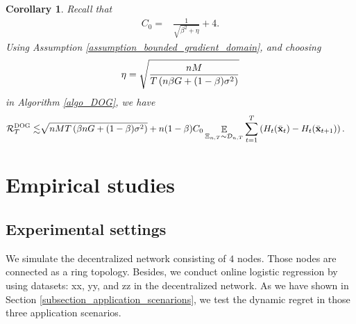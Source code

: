 \documentclass{article}
\newtheorem{Corollary}{\bf{Corollary}}
\newtheorem{Assumption}{\bf{Assumption}}
\begin{document}
\begin{Corollary}
Recall that 
\begin{align}
\nonumber
C_0 = & \frac{1}{\sqrt{\beta^2 + \eta}} + 4.
\end{align}
Using Assumption \ref{assumption_bounded_gradient_domain}, and choosing 
\begin{align}
\nonumber
\eta = \sqrt{\frac{nM}{ T\left( n\beta G + (1-\beta)\sigma^2 \right) }}
\end{align} in Algorithm \ref{algo_DOG}, we have
\begin{align}
\nonumber
{\mathcal{R}}_T^{\textsc{DOG}} \lesssim & \sqrt{nMT\left( \beta nG + (1-\beta)\sigma^2 \right)} + n(1-\beta)C_0  \mathop{\mathbb{E}}_{ \Xi_{n,T} \sim \mathcal{D}_{n,T} } \sum_{t=1}^T  \left( H_t(\bar{{\bf x}}_t) - H_t(\bar{{\bf x}}_{t+1}) \right).
\end{align}

\end{Corollary}














%















\section{Empirical studies}


\subsection{Experimental settings}
We simulate the decentralized network consisting of $4$ nodes. Those nodes are connected as a ring topology. Besides, we conduct online logistic regression by using datasets: xx, yy, and zz in the decentralized network.  As we have shown in Section \ref{subsection_application_scenarions}, we test the dynamic regret in those three application scenarios.  
\end{document}

